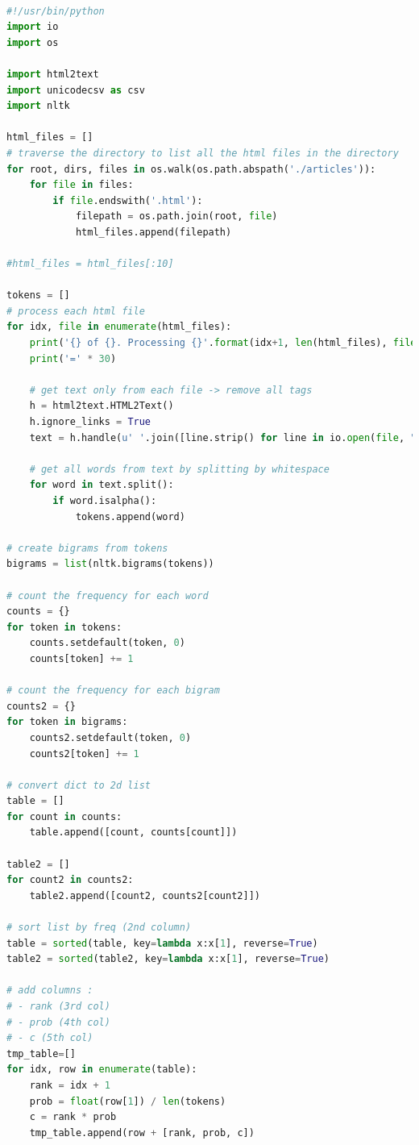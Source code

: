 \documentclass[letterpaper,11pt]{article}
\begin{document}
\begin{lstlisting}[language=python, caption={Tokenizing the content of Wikipedia collection}, label={lst:token-wiki}]

#!/usr/bin/python
import io
import os

import html2text
import unicodecsv as csv
import nltk

html_files = []
# traverse the directory to list all the html files in the directory
for root, dirs, files in os.walk(os.path.abspath('./articles')):
    for file in files:
        if file.endswith('.html'):
            filepath = os.path.join(root, file)
            html_files.append(filepath)

#html_files = html_files[:10]

tokens = []
# process each html file
for idx, file in enumerate(html_files):
    print('{} of {}. Processing {}'.format(idx+1, len(html_files), file))
    print('=' * 30)

    # get text only from each file -> remove all tags
    h = html2text.HTML2Text()
    h.ignore_links = True
    text = h.handle(u' '.join([line.strip() for line in io.open(file, "r", encoding="utf-8").readlines()]))

    # get all words from text by splitting by whitespace
    for word in text.split():
        if word.isalpha():
            tokens.append(word)

# create bigrams from tokens
bigrams = list(nltk.bigrams(tokens))

# count the frequency for each word
counts = {}
for token in tokens:
    counts.setdefault(token, 0)
    counts[token] += 1

# count the frequency for each bigram
counts2 = {}
for token in bigrams:
    counts2.setdefault(token, 0)
    counts2[token] += 1

# convert dict to 2d list
table = []
for count in counts:
    table.append([count, counts[count]])

table2 = []
for count2 in counts2:
    table2.append([count2, counts2[count2]])

# sort list by freq (2nd column)
table = sorted(table, key=lambda x:x[1], reverse=True)
table2 = sorted(table2, key=lambda x:x[1], reverse=True)

# add columns :
# - rank (3rd col)
# - prob (4th col)
# - c (5th col)
tmp_table=[]
for idx, row in enumerate(table):
    rank = idx + 1
    prob = float(row[1]) / len(tokens)
    c = rank * prob
    tmp_table.append(row + [rank, prob, c])


\end{lstlisting}
\end{document}
